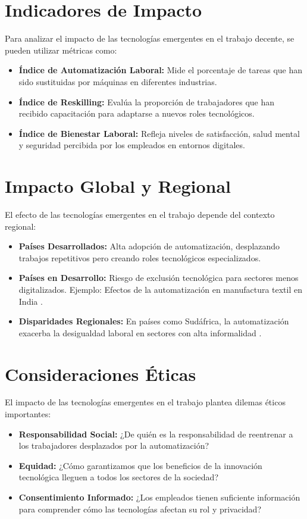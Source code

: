\begin{refsection}
\section{Indicadores de Impacto}
Para analizar el impacto de las tecnologías emergentes en el trabajo decente, se pueden utilizar métricas como:
\begin{itemize}
    \item \textbf{Índice de Automatización Laboral:} Mide el porcentaje de tareas que han sido sustituidas por máquinas en diferentes industrias.
    \item \textbf{Índice de Reskilling:} Evalúa la proporción de trabajadores que han recibido capacitación para adaptarse a nuevos roles tecnológicos.
    \item \textbf{Índice de Bienestar Laboral:} Refleja niveles de satisfacción, salud mental y seguridad percibida por los empleados en entornos digitales.
\end{itemize}

\section{Impacto Global y Regional}
El efecto de las tecnologías emergentes en el trabajo depende del contexto regional:
\begin{itemize}
    \item \textbf{Países Desarrollados:} Alta adopción de automatización, desplazando trabajos repetitivos pero creando roles tecnológicos especializados.
    \item \textbf{Países en Desarrollo:} Riesgo de exclusión tecnológica para sectores menos digitalizados. Ejemplo: Efectos de la automatización en manufactura textil en India \cite{WOS:000642127500001}.
    \item \textbf{Disparidades Regionales:} En países como Sudáfrica, la automatización exacerba la desigualdad laboral en sectores con alta informalidad \cite{WOS:000701263900009}.
\end{itemize}



\section{Consideraciones Éticas}
El impacto de las tecnologías emergentes en el trabajo plantea dilemas éticos importantes:
\begin{itemize}
    \item \textbf{Responsabilidad Social:} ¿De quién es la responsabilidad de reentrenar a los trabajadores desplazados por la automatización?
    \item \textbf{Equidad:} ¿Cómo garantizamos que los beneficios de la innovación tecnológica lleguen a todos los sectores de la sociedad?
    \item \textbf{Consentimiento Informado:} ¿Los empleados tienen suficiente información para comprender cómo las tecnologías afectan su rol y privacidad?
\end{itemize}



\end{refsection}
